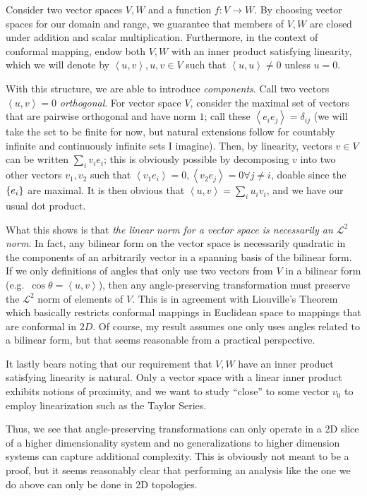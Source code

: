 \documentclass[12pt]{report}
\DeclarePairedDelimiter\z{\lbrace}{\rbrace}
\newcommand{\expvalue}[1]{\left<#1\right>}
\begin{document}
Consider two vector spaces $V, W$ and a function $f: V \to W$. By choosing
vector spaces for our domain and range, we guarantee that members of $V, W$ are
closed under addition and scalar multiplication. Furthermore, in the context of
conformal mapping, endow both $V, W$ with an inner product satisfying linearity,
which we will denote by $\expvalue{u, v}, u, v \in V$ such that $\expvalue{u, u}
\neq 0$ unless $u = 0$.

With this structure, we are able to introduce \emph{components}. Call two
vectors $\expvalue{u, v} = 0$ \emph{orthogonal}. For vector space $V$, consider
the maximal set of vectors that are pairwise orthogonal and have norm $1$; call
these $\expvalue{e_i e_j} = \delta_{ij}$ (we will take the set to be finite for
now, but natural extensions follow for countably infinite and continuously
infinite sets I imagine). Then, by linearity, vectors $v \in V$ can be written
$\sum\limits_i v_ie_i$; this is obviously possible by decomposing $v$ into two
other vectors $v_1, v_2$ such that $\expvalue{v_1 e_i} = 0, \expvalue{v_2e_j} =
0 \forall j \neq i$, doable since the $\z*{e_i}$ are maximal. It is then obvious
that $\expvalue{u, v} = \sum\limits_i u_iv_i$, and we have our usual dot
product.

What this shows is that \emph{the linear norm for a vector space is necessarily
an $\mathcal{L}^2$ norm}. In fact, any bilinear form on the vector space is
necessarily quadratic in the components of an arbitrarily vector in a spanning
basis of the bilinear form. If we only definitions of angles that only use two
vectors from $V$ in a bilinear form (e.g.\ $\cos\theta = \expvalue{u, v}$), then
any angle-preserving transformation must preserve the $\mathcal{L}^2$ norm of
elements of $V$. This is in agreement with Liouville's Theorem which basically
restricts conformal mappings in Euclidean space to mappings that are conformal
in $2D$. Of course, my result assumes one only uses angles related to a bilinear
form, but that seems reasonable from a practical perspective.

It lastly bears noting that our requirement that $V, W$ have an inner product
satisfying linearity is natural. Only a vector space with a linear inner product
exhibits notions of proximity, and we want to study ``close'' to some vector
$v_0$ to employ linearization such as the Taylor Series.

Thus, we see that angle-preserving transformations can only operate in a 2D
slice of a higher dimensionality system and no generalizations to higher
dimension systems can capture additional complexity. This is obviously not meant
to be a proof, but it seems reasonably clear that performing an analysis like
the one we do above can only be done in 2D topologies.
\end{document}

